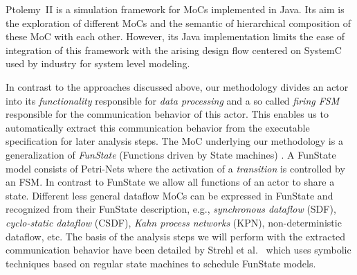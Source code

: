 Ptolemy~II \cite{ptolemyII} is a simulation framework for MoCs implemented in Java.
Its aim is the exploration of different MoCs and the semantic of hierarchical composition of these MoC with each other.
However, its Java implementation limits the ease of integration of this framework with the arising design flow centered on SystemC used by industry for system level modeling.

In contrast to the approaches discussed above, our methodology divides an actor into its \emph{functionality} responsible for \emph{data processing} and a so called \emph{firing FSM} responsible for the communication behavior of this actor.
This enables us to automatically extract this communication behavior from the executable specification for later analysis steps.
The MoC underlying our methodology is a generalization of \emph{FunState} (Functions driven by State machines) \cite{stgzet:2001}.
A FunState model consists of Petri-Nets where the activation of a \emph{transition} is controlled by an FSM.
In contrast to FunState we allow all functions of an actor to share a state.
Different less general dataflow MoCs can be expressed in FunState and recognized from their FunState description, e.g., \emph{synchronous dataflow} (SDF), \emph{cyclo-static dataflow} (CSDF), \emph{Kahn process networks} (KPN), non-deterministic dataflow, etc.
The basis of the analysis steps we will perform with the extracted communication behavior have been detailed by Strehl et al.~\cite{strehl:2000} which uses symbolic techniques based on regular state machines \cite{tts:2000} to schedule FunState models.

